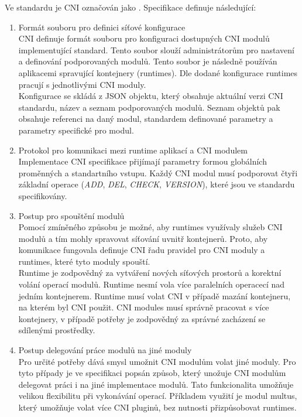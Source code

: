 Ve standardu je CNI označován jako  \cite{thekubernetesauthors_2023_container}. Specifikace definuje následující:
\begin{enumerate}
    \item Formát souboru pro definici síťové konfigurace\\
    CNI definuje formát souboru pro konfiguraci dostupných CNI modulů implementující standard. Tento soubor slouží administrátorům pro nastavení a definování podporovaných modulů. Tento soubor je následně používán aplikacemi spravující kontejnery (runtimes). Dle dodané konfigurace runtimes pracují s jednotlivými CNI moduly.\\
    Konfigurace se skládá z JSON objektu, který obsahuje aktuální verzi CNI standardu, název a seznam podporovaných modulů. Seznam objektů pak obsahuje referenci na daný modul, standardem definované parametry a parametry specifické pro modul.
    \item Protokol pro komunikaci mezi runtime aplikací a CNI modulem\\
    Implementace CNI specifikace přijímají parametry formou globálních proměnných a standartního vstupu. Každý CNI modul musí podporovat čtyři základní operace (\textit{ADD}, \textit{DEL}, \textit{CHECK}, \textit{VERSION}), které jsou ve standardu specifikovány.
    \item Postup pro spouštění modulů\\
    Pomocí zmíněného způsobu je možné, aby runtimes využívaly služeb CNI modulů a tím mohly spravovat síťování uvnitř kontejnerů. Proto, aby komunikace fungovala definuje CNI řadu pravidel pro CNI moduly a runtimes, které tyto moduly spouští.\\
    Runtime je zodpovědný za vytváření nových síťových prostorů a korektní volání operací modulů. Runtime nesmí vola více paralelních operacecí nad jedním kontejnerem. Runtime musí volat CNI v případě mazání kontejneru, na kterém byl CNI použit.
    CNI modules musí správně pracovat s více kontejnery, v případě potřeby je zodpovědný za správné zacházení se sdílenými prostředky. 
    \item Postup delegování práce modulů na jiné moduly\label{enumerate:cni}\\
    Pro určité potřeby dává smysl umožnit CNI modulům volat jiné moduly. Pro tyto případy je ve specifikaci popsán způsob, který unožuje CNI modulům delegovat práci i na jiné implementace modulů. Tato funkcionalita umožňuje velikou flexibilitu při vykonávání operací. Příkladem využití je modul multus, který umožňuje volat více CNI pluginů, bez nutnosti přizpůsobovat runtimes.\\

\end{enumerate}

